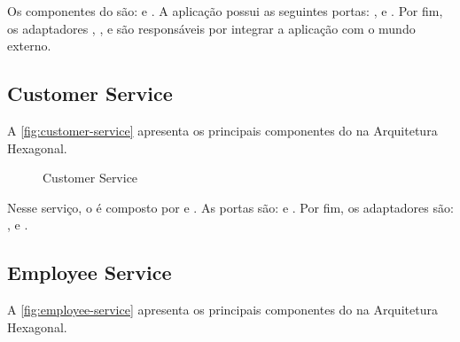 Os componentes do  são:  e . A aplicação possui as seguintes portas: ,  e . Por fim, os adaptadores , ,  e  são responsáveis por integrar a aplicação com o mundo externo.

\subsection{Customer Service}
A \autoref{fig:customer-service} apresenta os principais componentes do  na Arquitetura Hexagonal.

\begin{figure}[H]
    \centering
    \caption{Customer Service}
    \label{fig:customer-service}
\end{figure}

Nesse serviço, o  é composto por   e . As portas são:  e . Por fim, os adaptadores são: ,   e .

\subsection{Employee Service}
A \autoref{fig:employee-service} apresenta os principais componentes do  na Arquitetura Hexagonal.


